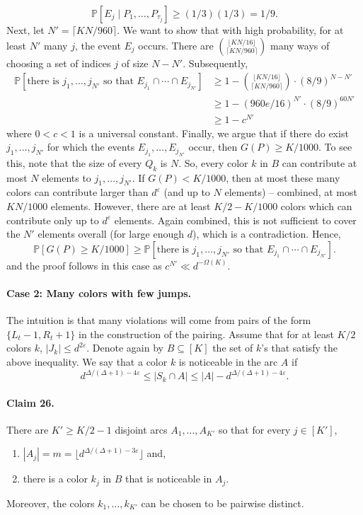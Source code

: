 \[\mathbb P[E_j\mid P_1,\ldots,P_{\tau_j}]\geq(1/3)(1/3)=1/9.\]
Next, let $N'=\lceil KN/960\rceil$. We want to show that with high probability, for at least $N'$ many $j$, the event $E_j$ occurs. There are $\binom{\lfloor KN/16\rfloor}{\lceil KN/960\rceil}$ many ways of choosing a set of indices $j$ of size $N-N'$. Subsequently,
\begin{align*}
\mathbb P[\text{there is }j_1,\ldots,j_{N'}\text{ so that }E_{j_1}\cap\cdots\cap E_{j_{N'}}]
&\geq1-\binom{\lfloor KN/16\rfloor}{\lceil KN/960\rceil}\cdot(8/9)^{N-N'}\\
&\geq1-(960e/16)^{N'}\cdot(8/9)^{60N'}\\
&\geq1-c^{N'}
\end{align*}
where $0<c<1$ is a universal constant. Finally, we argue that if there do exist $j_1,\ldots,j_{N'}$ for which the events $E_{j_1},\ldots,E_{j_{N'}}$ occur, then $G(P)\geq K/1000$. To see this, note that the size of every $Q_k$ is $N$. So, every color $k$ in $B$ can contribute at most $N$ elements to $j_1,\ldots,j_{N'}$. If $G(P)<K/1000$, then at most these many colors can contribute larger than $d^\varepsilon$ (and up to $N$ elements) -- combined, at most $KN/1000$ elements. However, there are at least $K/2-K/1000$ colors which can contribute only up to $d^\varepsilon$ elements. Again combined, this is not sufficient to cover the $N'$ elements overall (for large enough $d$), which is a contradiction. Hence,
\[\mathbb P[G(P)\geq K/1000]\geq\mathbb P[\text{there is }j_1,\ldots,j_{N'}\text{ so that }E_{j_1}\cap\cdots\cap E_{j_{N'}}].\]
and the proof follows in this case as $c^{N'}\ll d^{-\Omega(K)}$.
\paragraph{Case 2: Many colors with few jumps.}
The intuition is that many violations will come from pairs of the form $\{L_t-1,R_t+1\}$ in the construction of the pairing. Assume that for at least $K/2$ colors $k$, $|J_k|\leq d^{2\varepsilon}$. Denote again by $B\subseteq[K]$ the set of $k$'s that satisfy the above inequality. We say that a color $k$ is noticeable in the arc $A$ if
\[d^{\Delta/(\Delta+1)-4\varepsilon}\leq|S_k\cap A|\leq|A|-d^{\Delta/(\Delta+1)-4\varepsilon}.\]
\paragraph{Claim 26.} There are $K'\geq K/2-1$ disjoint arcs $A_1,\ldots,A_{K'}$ so that for every $j\in[K']$,
\begin{enumerate}
\item $|A_j|=m=\lfloor d^{\Delta/(\Delta+1)-3\varepsilon}\rfloor$ and,
\item there is a color $k_j$ in $B$ that is noticeable in $A_j$.
\end{enumerate}
Moreover, the colors $k_1,\ldots,k_{K'}$ can be chosen to be pairwise distinct.
